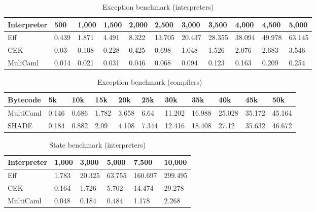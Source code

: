 \begin{table}[h]
\footnotesize
\centering
{\renewcommand{\arraystretch}{1.3}
\begin{tabular}{lllllllllll}
    \toprule
    Interpreter & 500 & 1,000 & 1,500 & 2,000 & 2,500 & 3,000 & 3,500 & 4,000 & 4,500 & 5,000 \\
    \midrule
    Eff & 0.439 & 1.871 & 4.491 & 8.322 & 13.705 & 20.437 & 28.355 & 38.094 & 49.978 & 63.145 \\
    CEK & 0.03 & 0.108 & 0.228 & 0.425 & 0.698 & 1.048 & 1.526 & 2.076 & 2.683 & 3.546 \\
    MuliCaml & 0.014 & 0.021 & 0.031 & 0.046 & 0.068 & 0.094 & 0.123 & 0.163 & 0.209 & 0.254 \\
    \bottomrule
\end{tabular}}
\caption{Exception benchmark (interpreters)}
\label{tab:interp-exception-measurements}
\end{table}
%
\begin{table}[h]
\footnotesize
\centering
{\renewcommand{\arraystretch}{1.3}
\begin{tabular}{lllllllllll}
    \toprule
    Bytecode & 5k & 10k & 15k & 20k & 25k & 30k & 35k & 40k & 45k & 50k \\
    \midrule
    MultiCaml & 0.146 & 0.686 & 1.782 & 3.658 & 6.64 & 11.202 & 16.988 & 25.028 & 35.172 & 45.164 \\
    SHADE & 0.184 & 0.882 & 2.09 & 4.108 & 7.344 & 12.416 & 18.408 & 27.12 & 35.632 & 46.672 \\
    \bottomrule
\end{tabular}}
\caption{Exception benchmark (compilers)}
\label{tab:comp-exception-measurements}
\end{table}
%
\begin{table}[h]
\footnotesize
\centering
{\renewcommand{\arraystretch}{1.3}
\begin{tabular}{llllll}
    \toprule
    Interpreter & 1,000 & 3,000 & 5,000 & 7,500 & 10,000 \\
    \midrule
    Eff & 1.783 & 20.325 & 63.755 & 160.697 & 299.495 \\
    CEK & 0.164 & 1.726 & 5.702 & 14.474 & 29.278 \\
    MultiCaml & 0.048 & 0.184 & 0.484 & 1.178 & 2.268 \\
    \bottomrule
\end{tabular}}
\caption{State benchmark (interpreters)}
\label{tab:interp-state-measurements}
\end{table}
